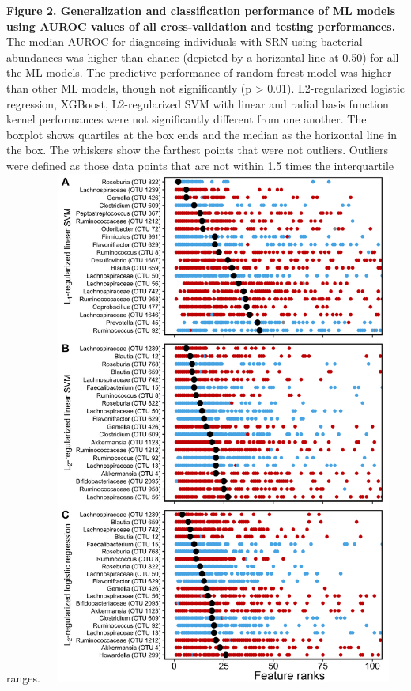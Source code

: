 \documentclass[11pt,]{article}
\begin{document}
\textbf{Figure 2. Generalization and classification performance of ML
models using AUROC values of all cross-validation and testing
performances.} The median AUROC for diagnosing individuals with SRN
using bacterial abundances was higher than chance (depicted by a
horizontal line at 0.50) for all the ML models. The predictive
performance of random forest model was higher than other ML models,
though not significantly (p \textgreater{} 0.01). L2-regularized
logistic regression, XGBoost, L2-regularized SVM with linear and radial
basis function kernel performances were not significantly different from
one another. The boxplot shows quartiles at the box ends and the median
as the horizontal line in the box. The whiskers show the farthest points
that were not outliers. Outliers were defined as those data points that
are not within 1.5 times the interquartile ranges. \newpage
\includegraphics[height=17cm, width=12cm]{Figure_3.png}
\end{document}
